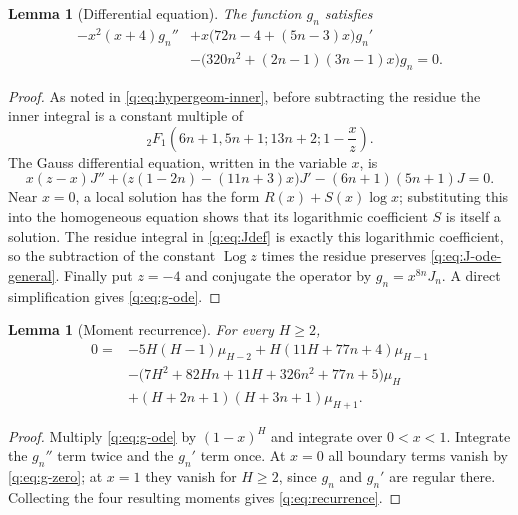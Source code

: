 \documentclass[11pt]{amsart}
\newcommand{\Log}{\operatorname{Log}}
\theoremstyle{plain}
\newtheorem{lemma}[theorem]{Lemma}
\theoremstyle{remark}\newtheorem{remark}[theorem]{Remark}
\numberwithin{equation}{section}
\begin{document}
\begin{lemma}[Differential equation]\label{q:lem:ode}
The function $g_n$ satisfies
\begin{equation}\label{q:eq:g-ode}
\begin{split}
 -x^2(x+4)g_n''
 &+x\bigl(72n-4+(5n-3)x\bigr)g_n'\\
 &-\bigl(320n^2+(2n-1)(3n-1)x\bigr)g_n=0.
\end{split}
\end{equation}
\end{lemma}

\begin{proof}
As noted in \eqref{q:eq:hypergeom-inner}, before subtracting the residue the
inner integral is a constant multiple of
\[
 {}_2F_1\left(6n+1,5n+1;13n+2;1-\frac{x}{z}\right).
\]
The Gauss differential equation, written in the variable $x$, is
\begin{equation}\label{q:eq:J-ode-general}
 x(z-x)J''+\bigl(z(1-2n)-(11n+3)x\bigr)J'
 -(6n+1)(5n+1)J=0.
\end{equation}
Near $x=0$, a local solution has the form $R(x)+S(x)\log x$; substituting
this into the homogeneous equation shows that its logarithmic coefficient
$S$ is itself a solution.  The residue integral in \eqref{q:eq:Jdef} is exactly
this logarithmic coefficient, so the subtraction of the constant $\Log z$
times the residue preserves \eqref{q:eq:J-ode-general}.  Finally put $z=-4$
and conjugate the operator by $g_n=x^{8n}J_n$.  A direct simplification gives
\eqref{q:eq:g-ode}.
\end{proof}

\begin{lemma}[Moment recurrence]\label{q:lem:recurrence}
For every $H\ge2$,
\begin{equation}\label{q:eq:recurrence}
\begin{split}
0={}&-5H(H-1)\mu_{H-2}
 +H(11H+77n+4)\mu_{H-1}\\
&-\bigl(7H^2+82Hn+11H+326n^2+77n+5\bigr)\mu_H\\
&+(H+2n+1)(H+3n+1)\mu_{H+1}.
\end{split}
\end{equation}
\end{lemma}

\begin{proof}
Multiply \eqref{q:eq:g-ode} by $(1-x)^H$ and integrate over $0<x<1$.
Integrate the $g_n''$ term twice and the $g_n'$ term once.  At $x=0$ all
boundary terms vanish by \eqref{q:eq:g-zero}; at $x=1$ they vanish for
$H\ge2$, since $g_n$ and $g_n'$ are regular there.  Collecting the four
resulting moments gives \eqref{q:eq:recurrence}.
\end{proof}
\end{document}
